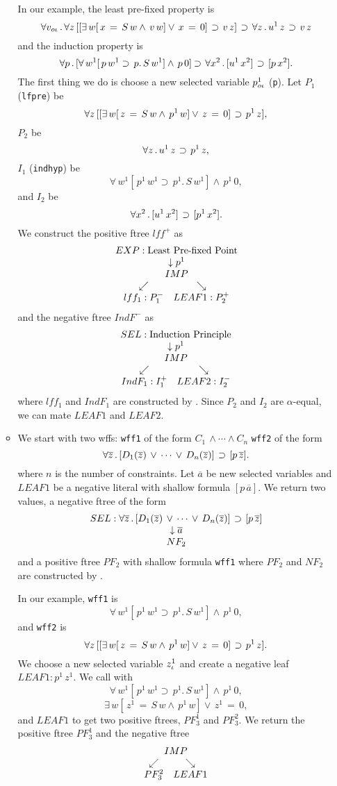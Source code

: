 \begin{enumerate}
\begin{itemize}
In our example, the least pre-fixed property is
$$\forall v_{o\iota}\, . \, \forall z\, [[\exists \,w [ \,x \,= \,S \,w \land \,v \,w] \lor \,x \,= \,0]
\, \mathbin{\supset} \, v\, z]
\,\mathbin{\supset}\, \forall z\, .\, u^1\, z\, \mathbin{\supset} \, v\, z$$
and the induction property is
$$\forall p\, .\, [\forall \,w^1 [ \,p \,w^1 \supset \,p . \,S \,w^1 ] \land \,p \,0]
\mathbin{\supset}\, \forall x^2\, . \, [u^1\, x^2]\,\mathbin{\supset}\, [p\, x^2].$$
The first thing we do is choose a new selected variable $p^1_{o\iota}$
(\verb+p+).
Let $P_1$ (\verb+lfpre+) be
$$\forall z\, [[\exists \,w [ \,z \,= \,S \,w \land \,p^1 \,w] \lor \,z \,= \,0]
\, \mathbin{\supset} \, p^1\, z],$$
$P_2$ be
$$\forall z\, .\, u^1\, z\, \mathbin{\supset} \, p^1\, z,$$
$I_1$ (\verb+indhyp+) be
$$\forall \,w^1 [ \,p^1 \,w^1 \supset \,p^1 . \,S \,w^1 ] \land \,p^1 \,0,$$
and $I_2$ be
$$\forall x^2\, . \, [u^1\, x^2]\,\mathbin{\supset}\, [p^1\, x^2].$$
We construct the positive ftree $lff^+$ as
$${{\begin{array}[t]{c}EXP: \mbox{Least Pre-fixed Point} \\ \begin{array}[t]{c} \downarrow p^1 \\ {{\begin{array}[t]{c}IMP \\ \begin{array}[t]{cc} \swarrow & \searrow \\ lff_1:P_1^- & LEAF1:P_2^+ \end{array}\end{array}}}\end{array}\end{array}}}$$
and the negative ftree $IndF^-$ as
$${{\begin{array}[t]{c}SEL: \mbox{Induction Principle} \\ \begin{array}[t]{c} \downarrow p^1 \\ {{\begin{array}[t]{c}IMP \\ \begin{array}[t]{cc} \swarrow & \searrow \\ IndF_1:I_1^+ & LEAF2:I_2^- \end{array}\end{array}}}\end{array}\end{array}}}$$
where $lff_1$ and $IndF_1$ are constructed by .
Since $P_2$ and $I_2$ are $\alpha$-equal, we can mate $LEAF1$ and $LEAF2$.

\item {\bf {}}
We start with two wffs: \verb+wff1+ of the form
$C_1\,\land \cdots \land C_n$
\verb+wff2+ of the form
$$\forall \overline{z} \, . \, [D_1(\overline{z})\,\lor\,\cdots\,\lor\, D_n(\overline{z})]\,\mathbin{\supset}\, [p\, \overline{z}].$$
where $n$ is the number of constraints.
Let $\overline{a}$ be new selected variables and $LEAF1$ be a negative literal
with shallow formula $[p\, \overline{a}]$.  We return two values, 
a negative ftree of the form
$${{\begin{array}[t]{c}SEL: \forall \overline{z} \, . \, [D_1(\overline{z})\,\lor\,\cdots\,\lor\, D_n(\overline{z})]\,\mathbin{\supset}\, [p\, \overline{z}] \\ \begin{array}[t]{c} \downarrow \overline{a} \\ NF_2\end{array}\end{array}}}$$
and a positive ftree $PF_2$ with shallow formula \verb+wff1+
where $PF_2$ and $NF_2$ are constructed by
.

In our example, \verb+wff1+ is
$$\forall \,w^1 [ \,p^1 \,w^1 \supset \,p^1 . \,S \,w^1 ] \land \,p^1 \,0,$$
and \verb+wff2+ is
$$\forall z\, [[\exists \,w [ \,z \,= \,S \,w \land \,p^1 \,w] \lor \,z \,= \,0]
\, \mathbin{\supset} \, p^1\, z].$$
We choose a new selected variable $z^1_\iota$ and create a negative leaf
$LEAF1:p^1\, z^1$.
We call  with
$$\forall \,w^1 [ \,p^1 \,w^1 \supset \,p^1 . \,S \,w^1 ] \land \,p^1 \,0,$$
$$\exists \,w [ \,z^1 \,= \,S \,w \land \,p^1 \,w] \lor \,z^1 \,= \,0,$$
and $LEAF1$ to get two positive ftrees, $PF_3^1$ and $PF_3^2$.
We return the positive ftree
$PF_3^1$ and the negative ftree
$${{\begin{array}[t]{c}IMP \\ \begin{array}[t]{cc} \swarrow & \searrow \\ PF_3^2 & LEAF1 \end{array}\end{array}}}$$


\end{itemize}
\end{enumerate}
